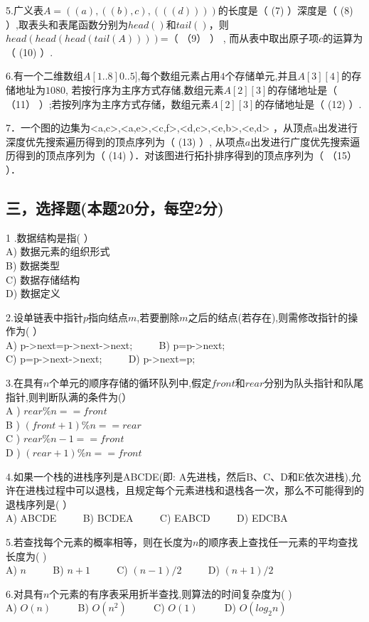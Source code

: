 5.广义表$A=((a),((b),c),(((d))))$的长度是（ (7) ）深度是（ (8) ）,取表头和表尾函数分别为$head()$和$tail()$，则$head(head(head(tail(A))))$=（ （9） ） , 而从表中取出原子项$c$的运算为（ (10)  ）.

6.有一个二维数组$A[1..8]0..5]$,每个数组元素占用$4$个存储单元,并且$A[3][4]$的存储地址为$1080$, 若按行序为主序方式存储,数组元素$A[2][3]$的存储地址是（ （11） ）;若按列序为主序方式存储，数组元素$A[2][3]$的存储地址是（ (12) ）.

7．一个图的边集为{<a,c>,<a,e>,<c,f>,<d,c>,<e,b>,<e,d>} ，从顶点a出发进行深度优先搜索遍历得到的顶点序列为（ (13) ）, 从项点$a$出发进行广度优先搜索逼历得到的顶点序列为（ (14) ）．对该图进行拓扑排序得到的顶点序列为（ （15） ）．

\subsection{三，选择题(本题20分，每空2分)}
1 .数据结构是指(  ） \\
A) 数据元素的组织形式 \\
B) 数据类型 \\
C) 数据存储结构 \\
D) 数据定义

2.设单链表中指针$p$指向结点$m$,若要删除$m$之后的结点(若存在),则需修改指针的操作为(  ） \\
A) p->next=p->next->next; $\qquad$ B) p=p->next; \\
C) p=p->next->next; $\qquad$ D) p->next=p;

3.在具有$n$个单元的顺序存储的循环队列中,假定$front$和$rear$分别为队头指针和队尾指针,则判断队满的条件为(） \\
A ) $rear\%n==front$ \\
B ) $(front+1)\%n==rear$ \\
C ) $rear\%n-1==front$ \\
D ) $(rear+1)\%n==front$

4.如果一个栈的进栈序列是ABCDE(即: A先进栈，然后B、C、D和E依次进栈),允许在进栈过程中可以退栈，且规定每个元素进栈和退栈各一次，那么不可能得到的退栈序列是(  ） \\
A) ABCDE $\qquad$ B) BCDEA $\qquad$ C) EABCD $\qquad$ D) EDCBA

5.若查找每个元素的概率相等，则在长度为$n$的顺序表上查找任一元素的平均查找长度为(  ) \\
A) $n$ $\qquad$ B) $n+1$ $\qquad$ C) $(n-1)/2$ $\qquad$ D) $(n+1)/2$

6.对具有$n$个元素的有序表采用折半查找,则算法的时间复杂度为(  ) \\
A) $O(n)$ $\qquad$ B) $O(n^2)$ $\qquad$ C) $O(1)$ $\qquad$ D) $O(log_2n)$

